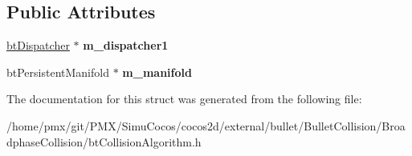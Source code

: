 \subsection*{Public Attributes}
\begin{DoxyCompactItemize}
\item 
\mbox{\label{structbtCollisionAlgorithmConstructionInfo_a3285c0f42be2df356875e54f9130bbb7}} 
\hyperlink{classbtDispatcher}{bt\+Dispatcher} $\ast$ {\bfseries m\+\_\+dispatcher1}
\item 
\mbox{\label{structbtCollisionAlgorithmConstructionInfo_adabf1b5832205a42bceb5e120ae0bb6c}} 
bt\+Persistent\+Manifold $\ast$ {\bfseries m\+\_\+manifold}
\end{DoxyCompactItemize}


The documentation for this struct was generated from the following file\+:\begin{DoxyCompactItemize}
\item 
/home/pmx/git/\+P\+M\+X/\+Simu\+Cocos/cocos2d/external/bullet/\+Bullet\+Collision/\+Broadphase\+Collision/bt\+Collision\+Algorithm.\+h\end{DoxyCompactItemize}
